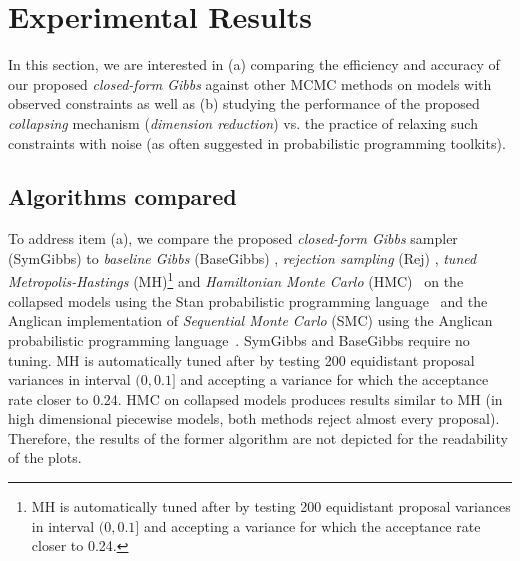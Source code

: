 \documentclass[letterpaper]{article}
\begin{document}
\section{Experimental Results}
\label{sect:experimental.results}
In this section, we are interested in (a) comparing the efficiency and accuracy of our proposed \emph{closed-form Gibbs} against other MCMC methods on  models with observed constraints as well as 
(b) studying the performance of the proposed \emph{collapsing} mechanism (\emph{dimension reduction}) vs. the practice of relaxing such constraints with noise
(as often suggested in probabilistic programming toolkits). 
%

\subsection{Algorithms compared} 

To address item (a), 
we compare the proposed \emph{closed-form Gibbs} sampler (SymGibbs) to
\emph{baseline Gibbs} (BaseGibbs) \cite{pearl1987evidential},
\emph{rejection sampling} (Rej) \cite{hammersley1964monte}, 
\emph{tuned Metropolis-Hastings} (MH)\footnote{MH is automatically tuned after \cite{roberts1997weak} by testing 200 equidistant proposal variances in interval $(0, 0.1]$ and accepting a variance for which the acceptance rate closer to 0.24.} %
and  
\emph{Hamiltonian Monte Carlo} (HMC)~\cite{neal2011mcmc} on the collapsed models using the Stan probabilistic programming language~\cite{stan-manual:2014}
and the Anglican implementation of \emph{Sequential Monte Carlo} (SMC) using the Anglican probabilistic programming language~\cite{wood2014new}.
SymGibbs and BaseGibbs require no tuning. MH is automatically tuned after \cite{roberts1997weak} by testing 200 equidistant proposal variances in interval $(0, 0.1]$ and accepting a variance for which the acceptance rate closer to 0.24.
HMC on collapsed models produces results similar to MH (in high dimensional piecewise models, both methods reject almost every proposal). Therefore, the results of the former algorithm are not depicted for the readability of the plots. 
\end{document}
